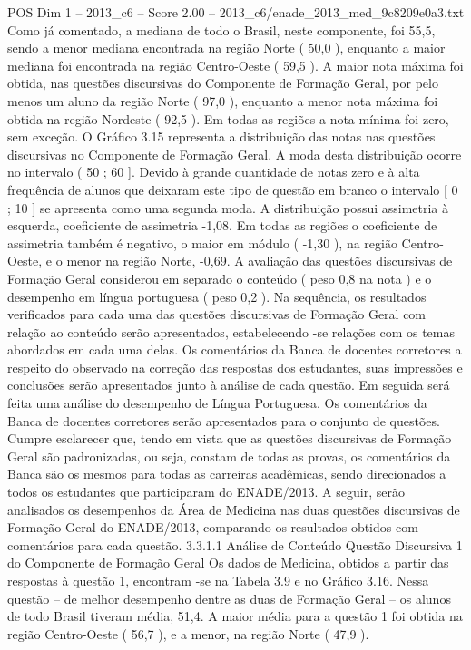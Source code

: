 \begin{textsample}{POS Dim 1 – 2013\_c6 – Score 2.00 – 2013\_c6/enade\_2013\_med\_9c8209e0a3.txt}
Como já comentado, a mediana de todo o Brasil, neste componente, foi 55,5, sendo a menor mediana encontrada na região Norte ( 50,0 ), enquanto a maior mediana foi encontrada na região Centro-Oeste ( 59,5 ).
A maior nota máxima foi obtida, nas questões discursivas do Componente de Formação Geral, por pelo menos um aluno da região Norte ( 97,0 ), enquanto a menor nota máxima foi obtida na região Nordeste ( 92,5 ).
Em todas as regiões a nota mínima foi zero, sem exceção.
O Gráfico 3.15 representa a distribuição das notas nas questões discursivas no Componente de Formação Geral.
A moda desta distribuição ocorre no intervalo ( 50 ; 60 ].
Devido à grande quantidade de notas zero e à alta frequência de alunos que deixaram este tipo de questão em branco o intervalo [ 0 ; 10 ] se apresenta como uma segunda moda.
A distribuição possui assimetria à esquerda, coeficiente de assimetria -1,08.
Em todas as regiões o coeficiente de assimetria também é negativo, o maior em módulo ( -1,30 ), na região Centro-Oeste, e o menor na região Norte, -0,69.
A avaliação das questões discursivas de Formação Geral considerou em separado o conteúdo ( peso 0,8 na nota ) e o desempenho em língua portuguesa ( peso 0,2 ).
Na sequência, os resultados verificados para cada uma das questões discursivas de Formação Geral com relação ao conteúdo serão apresentados, estabelecendo -se relações com os temas abordados em cada uma delas.
Os comentários da Banca de docentes corretores a respeito do observado na correção das respostas dos estudantes, suas impressões e conclusões serão apresentados junto à análise de cada questão.
Em seguida será feita uma análise do desempenho de Língua Portuguesa.
Os comentários da Banca de docentes corretores serão apresentados para o conjunto de questões.
Cumpre esclarecer que, tendo em vista que as questões discursivas de Formação Geral são padronizadas, ou seja, constam de todas as provas, os comentários da Banca são os mesmos para todas as carreiras acadêmicas, sendo direcionados a todos os estudantes que participaram do ENADE/2013.
A seguir, serão analisados os desempenhos da Área de Medicina nas duas questões discursivas de Formação Geral do ENADE/2013, comparando os resultados obtidos com comentários para cada questão. 3.3.1.1 Análise de Conteúdo Questão Discursiva 1 do Componente de Formação Geral Os dados de Medicina, obtidos a partir das respostas à questão 1, encontram -se na Tabela 3.9 e no Gráfico 3.16.
Nessa questão – de melhor desempenho dentre as duas de Formação Geral – os alunos de todo Brasil tiveram média, 51,4.
A maior média para a questão 1 foi obtida na região Centro-Oeste ( 56,7 ), e a menor, na região Norte ( 47,9 ).

\end{textsample}

